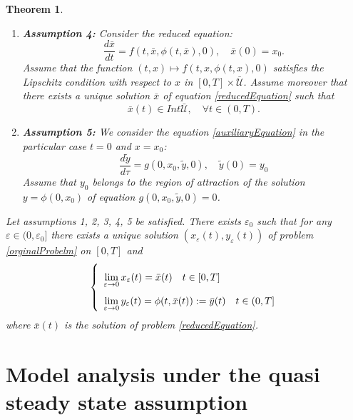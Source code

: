 \documentclass{article}
\renewcommand{\epsilon}{\varepsilon}
\newtheorem{theorem}{Theorem}
\begin{document}
\begin{theorem}
\begin{enumerate}
\item \textbf{Assumption 4:} 
Consider the reduced equation:
\begin{equation}\label{reducedEquation}
\dfrac{d\bar{x}}{dt} = f(t,\bar{x},\phi(t,\bar{x}), 0), \quad \bar{x}(0) = x_0.
\end{equation}
Assume that the function $(t,x) \mapsto f(t,x,\phi(t,x), 0)$ satisfies the Lipschitz condition with respect to $x$ in $[0, T]\times \mathcal{\bar{U}}$. Assume moreover that there exists a unique solution $\bar{x}$ of equation \eqref{reducedEquation} such that $$\bar{x}(t) \in Int \mathcal{\bar{U}}, \quad \forall t \in (0,T).$$

\item \textbf{Assumption 5:} We consider the equation \eqref{auxiliaryEquation} in the particular case $t=0$ and $x = x_0$:
\begin{equation}\label{auxiliaryEquation, 0}
\dfrac{d \tilde{y}}{d \tau} =  g(0, x_0,\tilde{y},0), \quad \tilde{y}(0) = y_0
\end{equation}
Assume that $y_0$ belongs to the region of attraction of the solution $y = \phi(0, x_0)$ of equation $g(0, x_0,\tilde{y},0) = 0$.
\end{enumerate}

Let assumptions 1, 2, 3, 4, 5 be satisfied. There exists $\epsilon_0$ such that for any $\epsilon \in (0, \epsilon_0]$ there exists a unique solution $(x_\epsilon(t), y_\epsilon(t))$ of problem \eqref{orginalProbelm} on $[0,T]$ and
\begin{equation}
\def\arraystretch{2}
\left\lbrace \begin{array}{l}
\lim\limits_{\epsilon \rightarrow 0}{x_\epsilon(t)} = \bar{x}(t) \quad t \in [0,T] \\
\lim\limits_{\epsilon \rightarrow 0} y_\epsilon(t) = \phi(t, \bar{x}(t)) := \bar{y}(t) \quad t \in (0,T] \\
\end{array} \right.
\end{equation}
where $\bar{x}(t)$ is the solution of problem \eqref{reducedEquation}.
\end{theorem}


\section{Model analysis under the quasi steady state assumption} \label{section:Model analysis under the quasi steady state assumption}
\end{document}
